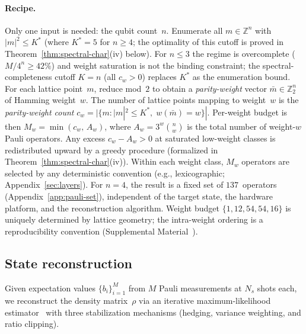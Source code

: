 \documentclass[twocolumn,prx,aps,superscriptaddress,longbibliography,floatfix]{revtex4-2}
\begin{document}
\paragraph{Recipe.}
Only one input is needed: the qubit count~$n$.  Enumerate all
$m \in \mathbb{Z}^n$ with $|m|^2 \le K^*$ (where $K^* = 5$ for
$n \ge 4$; the optimality of this cutoff is proved in
Theorem~\ref{thm:spectral-char}(iv) below).
For $n \le 3$ the regime is overcomplete
($M/4^n \ge 42\%$) and weight saturation is not the
binding constraint; the spectral-completeness cutoff
$K = n$ (all $c_w > 0$) replaces $K^*$ as the
enumeration bound.
For each lattice point~$m$, reduce mod~$2$ to obtain a
\emph{parity-weight} vector $\bar m \in \mathbb{Z}_2^n$ of
Hamming weight~$w$.  The number of lattice points mapping to
weight~$w$ is the \emph{parity-weight count}
$c_w = |\{m : |m|^2 \le K^*,\; w(\bar m) = w\}|$.
Per-weight budget is then
$M_w = \min(c_w,\, A_w)$, where $A_w = 3^w \binom{n}{w}$ is
the total number of weight-$w$ Pauli operators.
Any excess $c_w - A_w > 0$ at saturated low-weight classes is
redistributed upward by a greedy procedure
(formalized in Theorem~\ref{thm:spectral-char}(iv)).
Within each weight class, $M_w$ operators are selected by any
deterministic convention (e.g., lexicographic;
Appendix~\ref{sec:layers}).
For $n = 4$, the result is a fixed set of $137$~operators
(Appendix~\ref{app:pauli-set}), independent of the target state,
the hardware platform, and the reconstruction algorithm.
Weight budget $\{1, 12, 54, 54, 16\}$ is uniquely determined
by lattice geometry; the intra-weight ordering is a reproducibility
convention (Supplemental Material~\cite{supplemental}).

\subsection{State reconstruction}
\label{sec:reconstruction}

Given expectation values $\{b_i\}_{i=1}^M$ from $M$ Pauli measurements
at $N_s$ shots each, we reconstruct the density matrix~$\rho$ via
an iterative maximum-likelihood estimator~\cite{Banaszek1999,Hradil1997,Blume-Kohout2010}
with three stabilization mechanisms (hedging, variance weighting,
and ratio clipping).
\end{document}
